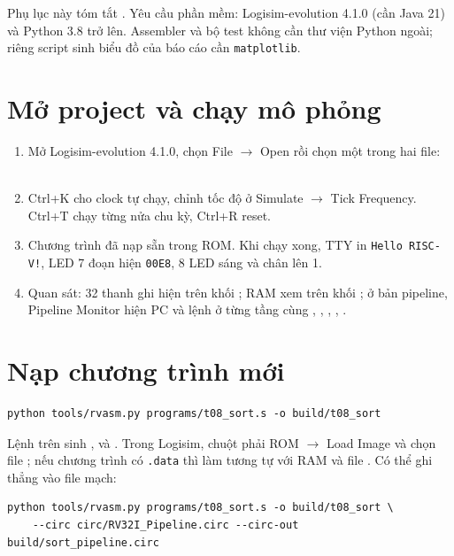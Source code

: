 \documentclass[../report.tex]{subfiles}
\begin{document}
Phụ lục này tóm tắt . Yêu cầu phần mềm: Logisim-evolution 4.1.0 (cần Java 21) và Python 3.8 trở lên.
Assembler và bộ test không cần thư viện Python ngoài; riêng script sinh biểu đồ của báo cáo cần \texttt{matplotlib}.

\section{Mở project và chạy mô phỏng}

\begin{enumerate}
  \item Mở Logisim-evolution 4.1.0, chọn File $\to$ Open rồi chọn một trong hai file:\\
        \\
  \item Ctrl+K cho clock tự chạy, chỉnh tốc độ ở Simulate $\to$ Tick Frequency. Ctrl+T chạy từng nửa chu kỳ,
        Ctrl+R reset.
  \item Chương trình  đã nạp sẵn trong ROM. Khi chạy xong, TTY in \texttt{Hello RISC-V!}, LED 7 đoạn hiện
        \texttt{00E8}, 8 LED sáng và chân  lên 1.
  \item Quan sát: 32 thanh ghi hiện trên khối ; RAM xem trên khối ; ở bản pipeline,
        Pipeline Monitor hiện PC và lệnh ở từng tầng cùng , , , ,
        .
\end{enumerate}

\section{Nạp chương trình mới}

\begin{lstlisting}
python tools/rvasm.py programs/t08_sort.s -o build/t08_sort
\end{lstlisting}

Lệnh trên sinh ,  và . Trong Logisim, chuột phải ROM
 $\to$ Load Image và chọn file ; nếu chương trình có \texttt{.data} thì làm tương tự với RAM
 và file . Có thể ghi thẳng vào file mạch:

\begin{lstlisting}
python tools/rvasm.py programs/t08_sort.s -o build/t08_sort \
    --circ circ/RV32I_Pipeline.circ --circ-out build/sort_pipeline.circ
\end{lstlisting}
\end{document}
